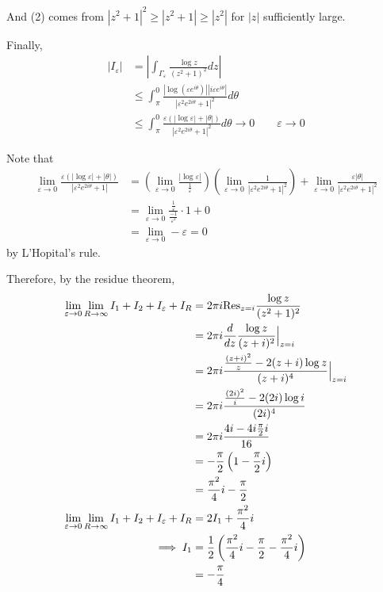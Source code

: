 \documentclass[12pt]{Qual}
\begin{document}
\begin{solution}
And (2) comes from $|z^2+1|^2\ge |z^2+1|\ge |z^2|$ for $|z|$ sufficiently large.

Finally, \begin{align*}
    |I_\varepsilon|&=\left|\int_{\Gamma_\varepsilon}\frac{\log z}{(z^2+1)^2}dz\right|\\
    &\le\int_\pi^0\frac{|\log(\varepsilon e^{i\theta})||i\varepsilon e^{i\theta}|}{|\varepsilon^2e^{2i\theta}+1|^2}d\theta\\
    &\le\int_\pi^0\frac{\varepsilon(|\log \varepsilon|+|\theta|)}{|\varepsilon^2e^{2i\theta}+1|^2}d\theta\to0\qquad\varepsilon\to0
\end{align*}

Note that \begin{align*}
    \lim_{\varepsilon\to0}\frac{\varepsilon(|\log \varepsilon|+|\theta|)}{|\varepsilon^2e^{2i\theta}+1|}&=\left(\lim_{\varepsilon\to0}\frac{|\log \varepsilon|}{\frac{1}{\varepsilon}}\right)\left(\lim_{\varepsilon\to0}\frac{1}{|\varepsilon^2e^{2i\theta}+1|^2}\right)+\lim_{\varepsilon\to0}\frac{\varepsilon|\theta|}{|\varepsilon^2e^{2i\theta}+1|^2}\\
    &=\lim_{\varepsilon\to0}\frac{\frac{1}{\varepsilon}}{\frac{-1}{\varepsilon^2}}\cdot1+0\\
    &=\lim_{\varepsilon\to0}-\varepsilon=0
\end{align*} by L'Hopital's rule.

Therefore, by the residue theorem, \begin{align*}
    \lim_{\varepsilon\to0}\lim_{R\to\infty}I_1+I_2+I_\varepsilon+I_R&=2\pi i\text{Res}_{z=i}\frac{\log z}{(z^2+1)^2}\\
    &=2\pi i\frac{d}{dz}\frac{\log z}{(z+i)^2}\Big|_{z=i}\\
    &=2\pi i\frac{\frac{(z+i)^2}{z}-2(z+i)\log z}{(z+i)^4}\Big|_{z=i}\\
    &=2\pi i\frac{\frac{(2i)^2}{i}-2(2i)\log i}{(2i)^4}\\
    &=2\pi i\frac{4i-4i\frac{\pi}{2}i}{16}\\
    &=-\frac{\pi}{2}\left(1-\frac{\pi}{2}i\right)\\
    &=\frac{\pi^2}{4}i-\frac{\pi}{2}\\
    \lim_{\varepsilon\to0}\lim_{R\to\infty}I_1+I_2+I_\varepsilon+I_R&=2I_1+\frac{\pi^2}{4}i\\
    \implies I_1&=\frac{1}{2}\left(\frac{\pi^2}{4}i-\frac{\pi}{2}-\frac{\pi^2}{4}i\right)\\
    &=-\frac{\pi}{4}
\end{align*}
\end{solution}
\newpage
\end{document}
